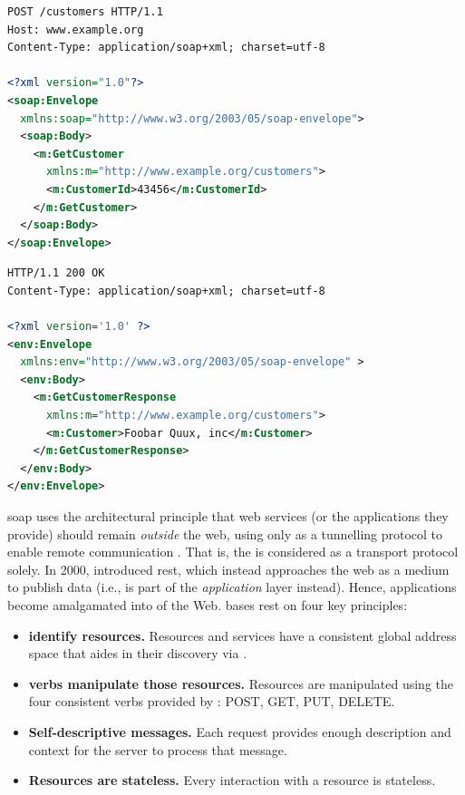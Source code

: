 \begin{samepage}
\begin{lstlisting}[language=xml,label=lst:background:apis:soap-request,caption={[An example SOAP request]A \gls{soap} \glsac{http} POST consumer request to retrieve customer record \#43456 from a web service provider. Source: \citep{Ballinger:2014aa}.}]
POST /customers HTTP/1.1
Host: www.example.org
Content-Type: application/soap+xml; charset=utf-8

<?xml version="1.0"?>
<soap:Envelope 
  xmlns:soap="http://www.w3.org/2003/05/soap-envelope">
  <soap:Body>
    <m:GetCustomer 
      xmlns:m="http://www.example.org/customers">
      <m:CustomerId>43456</m:CustomerId>
    </m:GetCustomer>
  </soap:Body>
</soap:Envelope>
\end{lstlisting}
\begin{lstlisting}[language=xml,label=lst:background:apis:soap-response,caption={[An example SOAP response]The \gls{soap} \glsac{http} service provider response for \cref{lst:background:apis:soap-request}. Source: \citep{Ballinger:2014aa}.}]
HTTP/1.1 200 OK
Content-Type: application/soap+xml; charset=utf-8

<?xml version='1.0' ?>
<env:Envelope 
  xmlns:env="http://www.w3.org/2003/05/soap-envelope" >
  <env:Body>
    <m:GetCustomerResponse 
      xmlns:m="http://www.example.org/customers">
      <m:Customer>Foobar Quux, inc</m:Customer>
    </m:GetCustomerResponse>
  </env:Body>
</env:Envelope>
\end{lstlisting}
\end{samepage}

\gls{soap} uses the architectural principle that web services (or the applications they provide) should remain \textit{outside} the web, using  only as a tunnelling protocol to enable remote communication \citep{Pautasso:2008uw}. That is, the  is considered as a transport protocol solely. In 2000, \citet{Fielding:2000vh} introduced \gls{rest}, which instead approaches the web as a medium to publish data (i.e.,  is part of the \textit{application} layer instead). Hence, applications become amalgamated into of the Web. \citeauthor{Fielding:2000vh} bases \gls{rest} on four key principles:

\begin{itemize}
  \item \textbf{ identify resources.} Resources and services have a consistent global address space that aides in their discovery via  \citep{BernersLee:2004vf}.
  \item \textbf{ verbs manipulate those resources.} Resources are manipulated using the four consistent  verbs provided by : POST, GET, PUT, DELETE.
  \item \textbf{Self-descriptive messages.} Each request provides enough description and context for the server to process that message.
  \item \textbf{Resources are stateless.} Every interaction with a resource is stateless.
\end{itemize}


